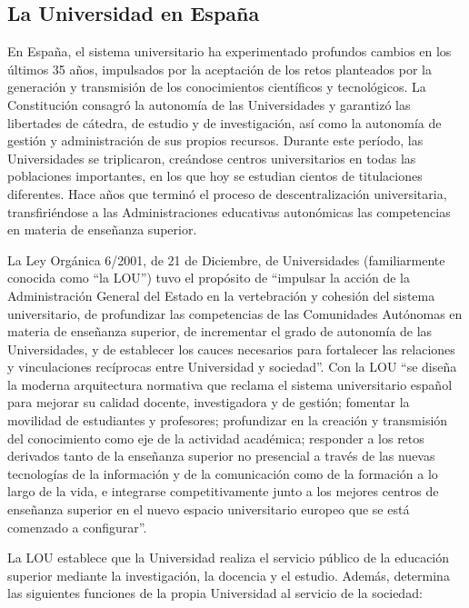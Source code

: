 \subsection{La Universidad en España}


En España, el sistema universitario ha experimentado profundos cambios en los últimos 35 años, impulsados por la aceptación de los retos planteados por la generación y transmisión de los conocimientos científicos y tecnológicos. La Constitución consagró la autonomía de las Universidades y garantizó las libertades de cátedra, de estudio y de investigación, así como la autonomía de gestión y administración de sus propios recursos. Durante este período, las Universidades se triplicaron, creándose centros universitarios en todas las poblaciones importantes, en los que hoy se estudian cientos de titulaciones diferentes. Hace años que terminó el proceso de descentralización universitaria, transfiriéndose a las Administraciones educativas autonómicas las competencias en materia de enseñanza superior. 

La Ley Orgánica 6/2001, de 21 de Diciembre, de Universidades (familiarmente conocida como ``la LOU'') tuvo el propósito de ``impulsar la acción de la Administración General del Estado en la vertebración y cohesión del sistema universitario, de profundizar las competencias de las Comunidades Autónomas en materia de enseñanza superior, de incrementar el grado de autonomía de las Universidades, y de establecer los cauces necesarios para fortalecer las relaciones y vinculaciones recíprocas entre Universidad y sociedad''. Con la LOU ``se diseña la moderna arquitectura normativa que reclama el sistema universitario español para mejorar su calidad docente, investigadora y de gestión; fomentar la movilidad de estudiantes y profesores; profundizar en la creación y transmisión del conocimiento como eje de la actividad académica; responder a los retos derivados tanto de la enseñanza superior no presencial a través de las nuevas tecnologías de la información y de la comunicación como de la formación a lo largo de la vida, e integrarse competitivamente junto a los mejores centros de enseñanza superior en el nuevo espacio universitario europeo que se está comenzado a configurar''.

La LOU establece que la Universidad realiza el servicio público de la educación superior mediante la investigación, la docencia y el estudio. Además, determina las siguientes funciones de la propia Universidad al servicio de la sociedad: 

